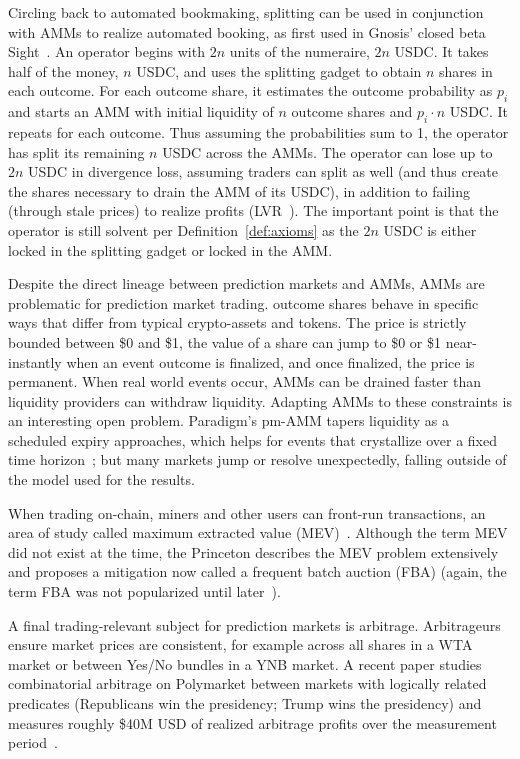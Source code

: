 Circling back to automated bookmaking, splitting can be used in conjunction with AMMs to realize automated booking, as first used in Gnosis' closed beta Sight~\cite{Bar19}. An operator begins with $2n$ units of the numeraire, \eg $2n$ USDC. It takes half of the money, $n$ USDC, and uses the splitting gadget to obtain $n$ shares in each outcome. For each outcome share, it estimates the outcome probability as $p_i$ and starts an AMM with initial liquidity of $n$ outcome shares and $p_i\cdot n$ USDC. It repeats for each outcome. Thus assuming the probabilities sum to 1, the operator has split its remaining $n$ USDC across the AMMs. The operator can lose up to $2n$ USDC in divergence loss, assuming traders can split as well (and thus create the shares necessary to drain the AMM of its USDC), in addition to failing (through stale prices) to realize profits (\ie LVR~\cite{MMRZ22}). The important point is that the operator is still solvent per Definition~\ref{def:axioms} as the $2n$ USDC is either locked in the splitting gadget or locked in the AMM.

Despite the direct lineage between prediction markets and AMMs, AMMs are problematic for prediction market trading. \depm outcome shares behave in specific ways that differ from typical crypto-assets and tokens. The price is strictly bounded between \$0 and \$1, the value of a share can jump to \$0 or \$1 near-instantly when an event outcome is finalized, and once finalized, the price is permanent. When real world events occur, AMMs can be drained faster than liquidity providers can withdraw liquidity. Adapting AMMs to these constraints is an interesting open problem. Paradigm’s pm-AMM tapers liquidity as a scheduled expiry approaches, which helps for events that crystallize over a fixed time horizon~\cite{MR24}; but many markets jump or resolve unexpectedly, falling outside of the model used for the results.

When trading on-chain, miners and other users can front-run transactions, an area of study called maximum extracted value (MEV)~\cite{BBDGJKLZ19}. Although the term MEV did not exist at the time, the Princeton \depm describes the MEV problem extensively~\cite{BCFKMN14} and proposes a mitigation now called a frequent batch auction (FBA) (again, the term FBA was not popularized until later~\cite{BCS15}).

A final trading-relevant subject for prediction markets is arbitrage. Arbitrageurs ensure market prices are consistent, for example across all shares in a WTA market or between Yes/No bundles in a YNB market. A recent paper studies combinatorial arbitrage on Polymarket between markets with logically related predicates (\eg Republicans win the presidency; Trump wins the presidency) and measures roughly \$40M USD of realized arbitrage profits over the measurement period~\cite{SGKS25}. 


